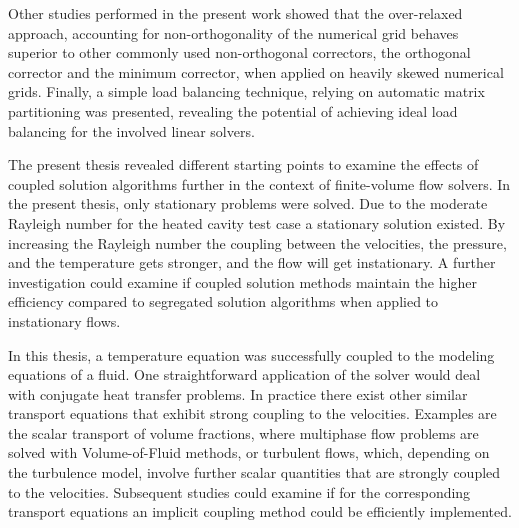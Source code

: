 Other studies performed in the present work showed that the over-relaxed approach, accounting for non-orthogonality of the numerical grid behaves superior to other commonly used non-orthogonal correctors, the orthogonal corrector and the minimum corrector, when applied on heavily skewed numerical grids.  Finally, a simple load balancing technique, relying on automatic matrix partitioning was presented, revealing the potential of achieving ideal load balancing for the involved linear solvers.

The present thesis revealed different starting points to examine the effects of coupled solution algorithms further in the context of finite-volume flow solvers. In the present thesis, only stationary problems were solved. Due to the moderate Rayleigh number for the heated cavity test case a stationary solution existed. By increasing the Rayleigh number the coupling between the velocities, the pressure, and the temperature gets stronger, and the flow will get instationary. A further investigation could examine if coupled solution methods maintain the higher efficiency compared to segregated solution algorithms when applied to instationary flows.

In this thesis, a temperature equation was successfully coupled to the modeling equations of a fluid. One straightforward application of the solver would deal with conjugate heat transfer problems. In practice there exist other similar transport equations that exhibit strong coupling to the velocities. Examples are the scalar transport of volume fractions, where multiphase flow problems are solved with Volume-of-Fluid methods, or turbulent flows, which, depending on the turbulence model, involve further scalar quantities that are strongly coupled to the velocities. Subsequent studies could examine if for the corresponding transport equations an implicit coupling method could be efficiently implemented.

